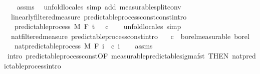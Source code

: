 \begin{isabellebody}
%
\isadelimproof
\ \ %
\endisadelimproof
%
\isatagproof
{}\isamarkupfalse%
\ assms\ \isamarkupfalse%
\ {\isacharparenleft}{\kern0pt}unfold{\isacharunderscore}{\kern0pt}locales{\isacharparenright}{\kern0pt}\ {\isacharparenleft}{\kern0pt}simp\ add{\isacharcolon}{\kern0pt}\ measurable{\isacharunderscore}{\kern0pt}split{\isacharunderscore}{\kern0pt}conv{\isacharparenright}{\kern0pt}%
\endisatagproof
{\isafoldproof}%
%
\isadelimproof
\isanewline
%
\endisadelimproof
\isanewline
{}\isamarkupfalse%
\ {\isacharparenleft}{\kern0pt}\ linearly{\isacharunderscore}{\kern0pt}filtered{\isacharunderscore}{\kern0pt}measure{\isacharparenright}{\kern0pt}\ predictable{\isacharunderscore}{\kern0pt}process{\isacharunderscore}{\kern0pt}const{\isacharunderscore}{\kern0pt}const{\isacharbrackleft}{\kern0pt}intro{\isacharbrackright}{\kern0pt}{\isacharcolon}{\kern0pt}\isanewline
\ \ \ {\isachardoublequoteopen}predictable{\isacharunderscore}{\kern0pt}process\ M\ F\ t\ {\isacharparenleft}{\kern0pt}{\isasymlambda}{\isacharunderscore}{\kern0pt}\ {\isacharunderscore}{\kern0pt}{\isachardot}{\kern0pt}\ c{\isacharparenright}{\kern0pt}{\isachardoublequoteclose}\isanewline
%
\isadelimproof
\ \ %
\endisadelimproof
%
\isatagproof
{}\isamarkupfalse%
\ {\isacharparenleft}{\kern0pt}unfold{\isacharunderscore}{\kern0pt}locales{\isacharparenright}{\kern0pt}\ simp%
\endisatagproof
{\isafoldproof}%
%
\isadelimproof
\isanewline
%
\endisadelimproof
\isanewline
{}\isamarkupfalse%
\ {\isacharparenleft}{\kern0pt}\ nat{\isacharunderscore}{\kern0pt}filtered{\isacharunderscore}{\kern0pt}measure{\isacharparenright}{\kern0pt}\ predictable{\isacharunderscore}{\kern0pt}process{\isacharunderscore}{\kern0pt}const{\isacharprime}{\kern0pt}{\isacharbrackleft}{\kern0pt}intro{\isacharbrackright}{\kern0pt}{\isacharcolon}{\kern0pt}\isanewline
\ \ \ {\isachardoublequoteopen}c\ {\isasymin}\ borel{\isacharunderscore}{\kern0pt}measurable\ borel{\isachardoublequoteclose}\isanewline
\ \ \ {\isachardoublequoteopen}nat{\isacharunderscore}{\kern0pt}predictable{\isacharunderscore}{\kern0pt}process\ M\ F\ {\isacharparenleft}{\kern0pt}{\isasymlambda}i\ {\isacharunderscore}{\kern0pt}{\isachardot}{\kern0pt}\ c\ i{\isacharparenright}{\kern0pt}{\isachardoublequoteclose}\isanewline
%
\isadelimproof
\ \ %
\endisadelimproof
%
\isatagproof
{}\isamarkupfalse%
\ assms\ \isamarkupfalse%
\ {\isacharparenleft}{\kern0pt}intro\ predictable{\isacharunderscore}{\kern0pt}process{\isacharunderscore}{\kern0pt}const{\isacharbrackleft}{\kern0pt}OF\ measurable{\isacharunderscore}{\kern0pt}predictable{\isacharunderscore}{\kern0pt}sigma{\isacharunderscore}{\kern0pt}fst{\isacharprime}{\kern0pt}{\isacharcomma}{\kern0pt}\ THEN\ nat{\isacharunderscore}{\kern0pt}predictable{\isacharunderscore}{\kern0pt}process{\isachardot}{\kern0pt}intro{\isacharbrackright}{\kern0pt}{\isacharparenright}{\kern0pt}%

\end{isabellebody}
